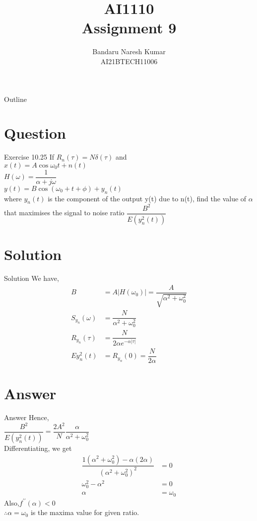 \documentclass{beamer}
\title{AI1110 \\ Assignment 9}
\author{Bandaru Naresh Kumar \\ AI21BTECH11006}
\date{}
\begin{document}
	\begin{frame}
		\titlepage
	\end{frame}
	
	\begin{frame}{Outline}
    		\tableofcontents
	\end{frame}
	
	\section{Question}
	\begin{frame}{Exercise 10.25}
       If $R_n(\tau) = N\delta(\tau)$ and\\
       $x(t) = A\cos\omega_0t + n(t)$\\
       $H(\omega) = \dfrac{1}{\alpha+j\omega}$\\
       $y(t) = B\cos(\omega_0 +t +\phi) + y_n(t)$\\
       where $y_n(t)$ is the component of the output y(t) due to n(t), find the value of $\alpha$ that maximises the signal to noise ratio $\dfrac{B^2}{E(y_n^2(t))}$
	\end{frame}
	
	\section{Solution}
	\begin{frame}{Solution}
	    We have,\\
	    \begin{align}
	    B &= A|H(\omega_0)| = \dfrac{A}{\sqrt{\alpha^2+\omega_0^2}}\\
	    S_{y_n}(\omega) &= \dfrac{N}{\alpha^2+\omega_0^2}\\
	    R_{y_n}(\tau) &= \dfrac{N}{2\alpha e^{-\alpha|\tau|}}\\
	    E{y_n^2(t)} &= R_{y_n}(0) = \dfrac{N}{2\alpha}
	    \end{align}
	 \end{frame}
	 
	\section{Answer}
	\begin{frame}{Answer}
	   Hence,\\
	    $\dfrac{B^2}{E(y_n^2(t))} = \dfrac{2A^2}{N}\dfrac{\alpha}{\alpha^2+\omega_0^2}$\\
	Differentiating, we get
	\begin{align}
	\dfrac{1(\alpha^2+\omega_0^2)-\alpha(2\alpha)}{(\alpha^2+\omega_0^2)^2} &= 0\\
	\omega_0^2 - \alpha^2 &= 0\\
	\alpha &= \omega_0 
	\end{align}
	Also,$f^{\prime\prime}(\alpha)<0$\\
	$\therefore\alpha = \omega_0$ is the maxima value for given             ratio.
	\end{frame}
\end{document}
